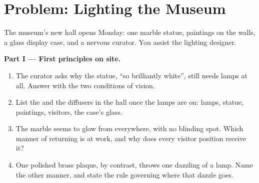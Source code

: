 \section{Problem: Lighting the Museum}

\begin{problem}\label{pb:g7:light-sources-propagation:1}
The museum's new hall opens Monday: one marble statue, paintings
on the walls, a glass display case, and a nervous curator. You
assist the lighting designer.

\medskip\noindent\textbf{Part I --- First principles on site.}
\begin{enumerate}
  \item The curator asks why the statue, ``so brilliantly
        white'', still needs lamps at all. Answer with the two
        conditions of vision.
  \item List the  and the diffusers in the hall
        once the lamps are on: lamps, statue, paintings,
        visitors, the case's glass.
  \item The marble seems to glow from everywhere, with no
        blinding spot. Which manner of returning  is at
        work, and why does every visitor position receive it?
  \item One polished brass plaque, by contrast, throws one
        dazzling  of a lamp. Name the other manner,
        and state the rule governing where that dazzle goes.
\end{enumerate}


\end{problem}
